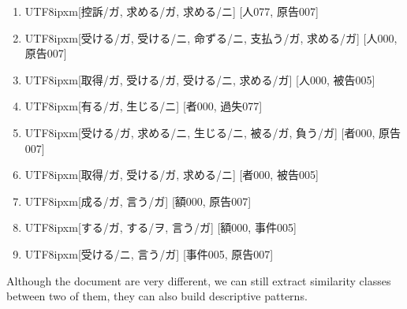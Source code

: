 \begin{enumerate}
\item \begin{CJK}{UTF8}{ipxm}[控訴/ガ, 求める/ガ, 求める/ニ] [人077, 原告007]\end{CJK}
\item \begin{CJK}{UTF8}{ipxm}[受ける/ガ, 受ける/ニ, 命ずる/ニ, 支払う/ガ, 求める/ガ] [人000, 原告007]\end{CJK}
\item \begin{CJK}{UTF8}{ipxm}[取得/ガ, 受ける/ガ, 受ける/ニ, 求める/ガ] [人000, 被告005]\end{CJK}
\item \begin{CJK}{UTF8}{ipxm}[有る/ガ, 生じる/ニ] [者000, 過失077]\end{CJK}
\item \begin{CJK}{UTF8}{ipxm}[受ける/ガ, 求める/ニ, 生じる/ニ, 被る/ガ, 負う/ガ] [者000, 原告007]\end{CJK}
\item \begin{CJK}{UTF8}{ipxm}[取得/ガ, 受ける/ガ, 求める/ニ] [者000, 被告005]\end{CJK}
\item \begin{CJK}{UTF8}{ipxm}[成る/ガ, 言う/ガ] [額000, 原告007]\end{CJK}
\item \begin{CJK}{UTF8}{ipxm}[する/ガ, する/ヲ, 言う/ガ] [額000, 事件005]\end{CJK}
\item \begin{CJK}{UTF8}{ipxm}[受ける/ニ, 言う/ガ] [事件005, 原告007]\end{CJK}
\end{enumerate}
Although the document are very different, we can still extract similarity classes between two of them, they can also build descriptive patterns.
